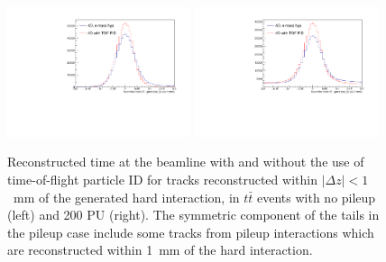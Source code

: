\begin{figure}[!hbtp]
\centering
\includegraphics[width=0.48\textwidth]{fig/performance/4dvtx/ttbarnopu/dttrkgen.pdf}
\includegraphics[width=0.48\textwidth]{fig/performance/4dvtx/ttbarpu200/dttrkgen.pdf}
\caption{Reconstructed time at the beamline with and without the use of time-of-flight particle ID for tracks reconstructed within $|\Delta z|<1$~mm of the generated hard interaction, in $t\bar t$ events with no pileup (left) and 200 PU (right).  The symmetric component of the tails in the pileup case include some tracks from pileup interactions which are reconstructed within 1~mm of the hard interaction.}
\label{fig:pidtres}
\end{figure}
